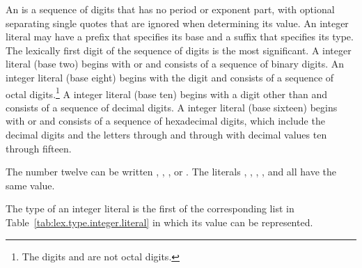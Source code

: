 \pnum
{}%
%
%
%
%
%
%
%
An  is a sequence of digits that has no period
or exponent part, with optional separating single quotes that are ignored
when determining its value. An integer literal may have a prefix that specifies
its base and a suffix that specifies its type. The lexically first digit
of the sequence of digits is the most significant.
A  integer literal (base two) begins with
 or  and consists of a sequence of binary digits.
An  integer
literal (base eight) begins with the digit  and consists of a
sequence of octal digits.\footnote{The digits  and  are not octal digits. }
A 
integer literal (base ten) begins with a digit other than  and
consists of a sequence of decimal digits.
A  integer literal (base sixteen) begins with
 or  and consists of a sequence of hexadecimal
digits, which include the decimal digits and the letters 
through  and  through  with decimal values
ten through fifteen.
\begin{example} The number twelve can be written , ,
, or . The literals ,
, , , and
 all have the same value.
\end{example}

\pnum
{}%
%
%
%
%
%
%
The type of an integer literal is the first of the corresponding list
in Table~\ref{tab:lex.type.integer.literal} in which its value can be
represented.

